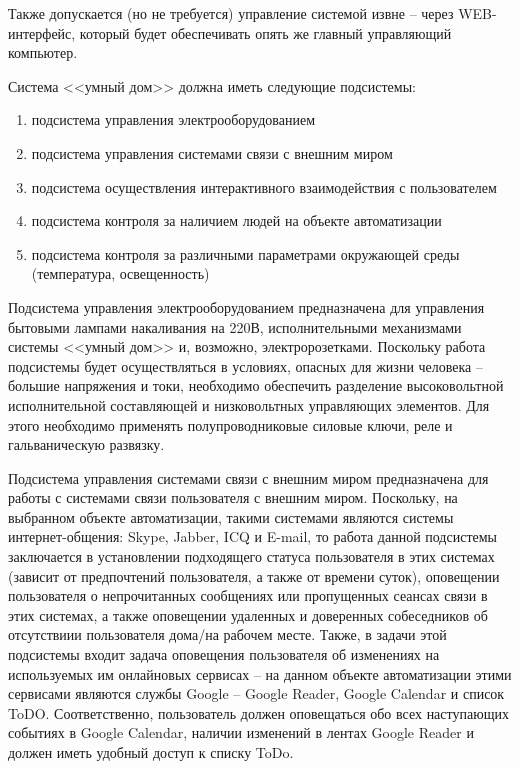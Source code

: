 \documentclass[a4paper, 12pt, titlepage]{article}
\begin{document}
Также допускается (но не требуется) управление системой извне -- через WEB-интерфейс, который будет обеспечивать опять же главный 
управляющий компьютер.

Система <<умный дом>> должна иметь следующие подсистемы:
\begin{enumerate}
\item подсистема управления электрооборудованием
\item подсистема управления системами связи с внешним миром
\item подсистема осуществления интерактивного взаимодействия с пользователем
\item подсистема контроля за наличием людей на объекте автоматизации
\item подсистема контроля за различными параметрами окружающей среды (температура, освещенность)
\end{enumerate}

Подсистема управления электрооборудованием предназначена для управления бытовыми лампами накаливания на 220В, 
исполнительными механизмами системы <<умный дом>> и, возможно, электророзетками. Поскольку работа подсистемы 
будет осуществляться в условиях, опасных для жизни человека -- большие напряжения и токи, необходимо обеспечить 
разделение высоковольтной исполнительной составляющей и низковольтных управляющих элементов. Для этого необходимо 
применять полупроводниковые силовые ключи, реле и гальваническую развязку.

Подсистема управления системами связи с внешним миром предназначена для работы с системами связи пользователя 
с внешним миром. Поскольку, на выбранном объекте автоматизации, такими системами являются системы интернет-общения: 
Skype, Jabber, ICQ и E-mail, то работа данной подсистемы заключается в установлении подходящего статуса пользователя 
в этих системах (зависит от предпочтений пользователя, а также от времени суток), оповещении пользователя о непрочитанных 
сообщениях или пропущенных сеансах связи в этих системах, а также оповещении удаленных и доверенных собеседников об 
отсутствиии пользователя дома/на рабочем месте. Также, в задачи этой подсистемы входит задача оповещения пользователя 
об изменениях на используемых им онлайновых сервисах -- на данном объекте автоматизации этими сервисами являются службы 
Google -- Google Reader, Google Calendar и список ToDO. Соответственно, пользователь должен оповещаться обо всех наступающих 
событиях в Google Calendar, наличии изменений в лентах Google Reader и должен иметь удобный доступ к списку ToDo.
\end{document}
